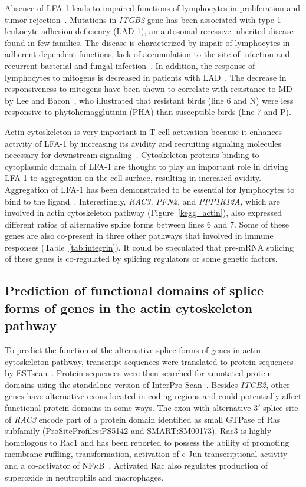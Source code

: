 \documentclass[10pt]{article}
\begin{document}
Absence of LFA-1 leads to impaired functions of lymphocytes in proliferation and
tumor rejection~\cite{scharffetter1998spontaneous,schmits1996lfa}.  Mutations in
{\em ITGB2} gene has been associated with type 1 leukocyte adhesion deficiency
(LAD-1), an autosomal-recessive inherited disease found in few families.  The
disease is characterized by impair of lymphocytes in adherent-dependent
functions, lack of accumulation to the site of infection and recurrent bacterial
and fungal infection~\cite{springer1987lymphocyte}.  In addition, the response
of lymphocytes to mitogens is decreased in patients with
LAD~\cite{springer1987lymphocyte}.  The decrease in responsiveness to mitogens
have been shown to correlate with resistance to MD by Lee and
Bacon~\cite{lee1983ontogeny}, who illustrated that resistant birds (line 6 and
N) were less responsive to phytohemagglutinin (PHA) than susceptible birds (line
7 and P).

Actin cytoskeleton is very important in T cell activation because it enhances
activity of LFA-1 by increasing its avidity and recruiting signaling molecules
necessary for downstream signaling~\cite{dustin2000immunological,
van2000avidity}.  Cytoskeleton proteins binding to cytoplasmic domain of LFA-1
are thought to play an important role in driving LFA-1 to aggregation on the
cell surface, resulting in increased avidity.  Aggregation of LFA-1 has been
demonstrated to be essential for lymphocytes to bind to the
ligand~\cite{van1994extracellular}.  Interestingly, {\em RAC3, PFN2,} and {\em
PPP1R12A}, which are involved in actin cytoskeleton pathway
(Figure~\ref{kegg_actin}), also expressed different ratios of alternative splice
forms between lines 6 and 7.  Some of these genes are also co-present in three
other pathways that involved in immune responses (Table~\ref{tab:integrin}).
It could be speculated that pre-mRNA splicing of these genes is co-regulated
by splicing regulators or some genetic factors.

\subsection*{Prediction of functional domains of splice forms of genes in the
actin cytoskeleton pathway}

To predict the function of the alternative splice forms of genes in actin
cytoskeleton pathway, transcript sequences were translated to protein sequences
by ESTscan~\cite{iseli1999estscan}.  Protein sequences were then searched for
annotated protein domains using the standalone version of InterPro
Scan~\cite{quevillon2005interproscan}.  Besides {\em ITGB2}, other genes have
alternative exons located in coding regions and could potentially affect
functional protein domains in some ways.  The exon with alternative 3$\prime$
splice site of {\em RAC3} encode part of a protein domain identified as small
GTPase of Ras subfamily (ProSiteProfiles:PS5142 and SMART:SM00173).  Rac3 is
highly homologous to Rac1 and has been reported to possess the ability of
promoting membrane ruffling, transformation, activation of c-Jun transcriptional
activity and a co-activator of NF$\kappa$B~\cite{werbajh2000rac}.  Activated Rac
also regulates production of superoxide in neutrophils and macrophages.
\end{document}
